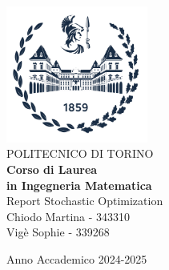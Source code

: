 \begin{titlepage}
    
    \begin{center}
    \includegraphics[width=0.35\textwidth]{img/logo_polito_2021.jpg}\\[1cm] 
    {\huge POLITECNICO DI TORINO}\\[1.5cm]
    \textbf{Corso di Laurea\\in Ingegneria Matematica}\\[3cm]
    
     
    {\huge Report Stochastic Optimization}\\[1cm]
    {\large Chiodo Martina - 343310 \\
    Vigè Sophie - 339268}
    
    
    
    \vfill
    
    Anno Accademico 2024-2025
    \end{center}
    
    \restoregeometry
    
    \end{titlepage}